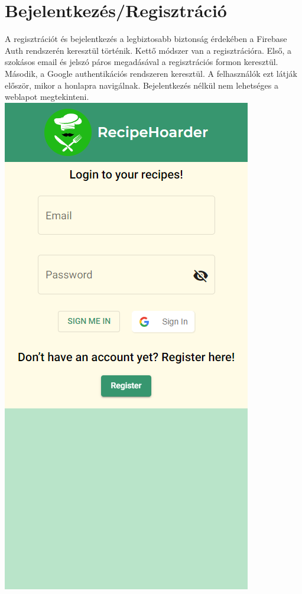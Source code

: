 \documentclass[12pt]{report}
\theoremstyle{definition}
\begin{document}
\section{Bejelentkezés/Regisztráció}
A regisztrációt és bejelentkezés a legbiztosabb biztonság érdekében a Firebase Auth rendszerén keresztül történik. Kettő módszer van a regisztrációra. Első, a szokásos email és jelszó páros megadásával a regisztrációs formon keresztül. Második, a Google authentikációs rendszeren keresztül. A felhasználók ezt látják először, mikor a honlapra navigálnak. Bejelentkezés nélkül nem lehetséges a weblapot megtekinteni.
\noindent
\includegraphics[scale=0.5]{pictures/mobil_login.png}
\end{document}
